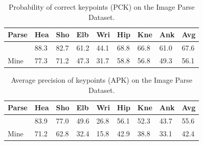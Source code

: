 \documentclass[10pt,twocolumn,letterpaper]{article}
\begin{document}
\begin{table}[t]
  \begin{center}
    \begin{tabular}{|p{0.8cm}|p{0.5cm}|p{0.5cm}|p{0.5cm}|p{0.5cm}|p{0.5cm}|p{0.5cm}|p{0.5cm}||p{0.5cm}|}
      \hline
      Parse                & Hea  & Sho  & Elb  & Wri  & Hip  & Kne  & Ank  & Avg  \\ \hline
      \hline
      \cite{Yang_PAMI2011} & 88.3 & 82.7 & 61.2 & 44.1 & 68.8 & 66.8 & 61.0 & 67.6 \\ \hline
      Mine                 & 77.3 & 71.2 & 47.3 & 31.7 & 58.8 & 56.8 & 49.3 & 56.1 \\ \hline
    \end{tabular}
  \end{center}
  \caption{Probability of correct keypoints (PCK) on the Image Parse Dataset.}
  \label{tab:pck_parse}
\end{table}

\begin{table}
  \begin{center}
    \begin{tabular}{|p{0.8cm}|p{0.5cm}|p{0.5cm}|p{0.5cm}|p{0.5cm}|p{0.5cm}|p{0.5cm}|p{0.5cm}||p{0.5cm}|}
      \hline
      Parse                & Hea  & Sho  & Elb  & Wri  & Hip  & Kne  & Ank  & Avg \\ \hline
      \hline
      \cite{Yang_PAMI2011} & 83.9 & 77.0 & 49.6 & 26.8 & 56.1 & 52.3 & 43.7 & 55.6 \\ \hline
      Mine                 & 71.2 & 62.8 & 32.4 & 15.8 & 42.9 & 38.8 & 33.1 & 42.4 \\ \hline
    \end{tabular}
  \end{center}
  \caption{Average precision of keypoints (APK) on the Image Parse Dataset.}
  \label{tab:apk_parse}
\end{table}
\end{document}
